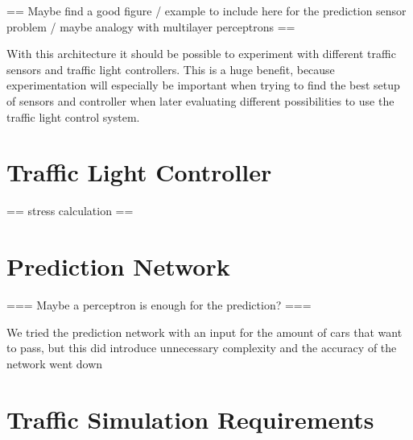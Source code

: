 == Maybe find a good figure / example to include here for the prediction sensor problem / maybe analogy with multilayer perceptrons ==

With this architecture it should be possible to experiment with different traffic sensors and traffic light controllers. This is a huge benefit, because experimentation will especially be important when trying to find the best setup of sensors and controller when later evaluating different possibilities to use the traffic light control system.

\section{Traffic Light Controller}
\label{trafficLightController}

== stress calculation ==

\section{Prediction Network}
\label{predictionNetwork}

=== Maybe a perceptron is enough for the prediction? ===

We tried the prediction network with an input for the amount of cars that want to pass, but this did introduce unnecessary complexity and the accuracy of the network went down

\section{Traffic Simulation Requirements}